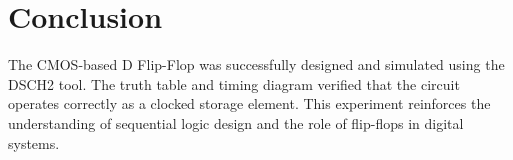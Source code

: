 \documentclass[12pt]{article}
\begin{document}
\section{Conclusion}
The CMOS-based D Flip-Flop was successfully designed and simulated using the DSCH2 tool. The truth table and timing diagram verified that the circuit operates correctly as a clocked storage element. This experiment reinforces the understanding of sequential logic design and the role of flip-flops in digital systems.
\end{document}
